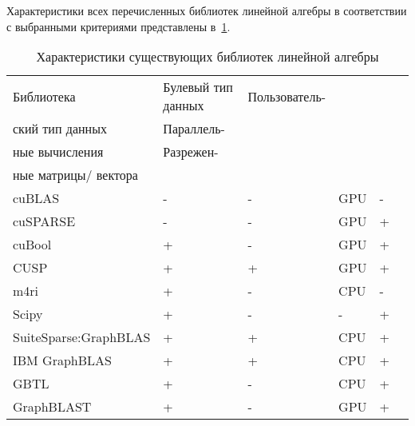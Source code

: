 Характеристики всех перечисленных библиотек линейной алгебры в соответствии с выбранными критериями представлены в~\cref{tab:LAlibraries}.


\begin{table} [htbp]
    \centering
    \begin{threeparttable}%
        \caption{Характеристики существующих библиотек линейной алгебры}\label{tab:LAlibraries}%
        \begin{tabular}{| p{5.1cm} || p{2.2cm} | p{3cm} | p{2.2cm} | p{2.2cm}l |}
            \hline
            \hline
            Библиотека   & \centering Булевый тип данных & \centering Пользователь-\\ ский тип данных & \centering  Параллель-\\ ные вычисления & \centering  Разрежен-\\ ные матрицы/ вектора &\\
            \hline
            cuBLAS & \centering	- & \centering -	 & \centering GPU	 & \centering -	 & \\
            cuSPARSE & \centering -	 & \centering -	 & \centering GPU	 & \centering +	 & \\
            cuBool & \centering	 + & \centering	- & \centering GPU	 & \centering +	 & \\
            CUSP & \centering	 + & \centering	+ & \centering GPU	 & \centering +	 & \\
            m4ri & \centering +	 & \centering -	 & \centering CPU	 & \centering -	 & \\
            Scipy & \centering +	& \centering -	 & \centering -	 & \centering +	 & \\
            SuiteSparse:GraphBLAS & \centering +& \centering +	 & \centering CPU	 & \centering	+ & \\
            IBM GraphBLAS & \centering +	 & \centering +	 & \centering CPU	 & \centering +	 & \\
            GBTL & \centering + & \centering -	 & \centering	CPU & \centering +	 & \\
            GraphBLAST & \centering +	 & \centering -	 & \centering GPU	 & \centering +	 & \\
            \hline
            \hline
        \end{tabular}
    \end{threeparttable}
\end{table}



